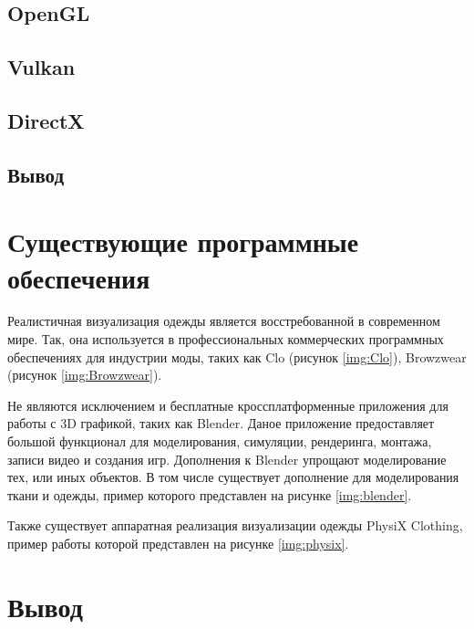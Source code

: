 \subsection{OpenGL}

\subsection{Vulkan}

\subsection{DirectX}

\subsection*{Вывод}

\section{Существующие программные обеспечения}

Реалистичная визуализация одежды является восстребованной в современном мире.
Так, она используется в профессиональных коммерческих программных обеспечениях
для индустрии моды, таких как Clo\cite{site01} (рисунок \ref{img:Clo}),
Browzwear\cite{site02} (рисунок \ref{img:Browzwear}).


Не являются исключением и бесплатные кроссплатформенные приложения для работы с
3D графикой, таких как Blender. Даное приложение предоставляет большой
функционал для моделирования, симуляции, рендеринга, монтажа, записи видео и
создания игр. Дополнения к Blender упрощают моделирование тех, или иных
объектов. В том числе существует дополнение для моделирования ткани и одежды,
пример которого представлен на рисунке \ref{img:blender}.


Также существует аппаратная реализация визуализации одежды PhysiX
Clothing\cite{site03}, пример работы которой представлен на рисунке
\ref{img:physix}.


\section*{Вывод}

